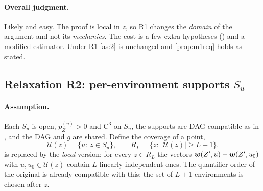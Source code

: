 \paragraph{Overall judgment.} Likely and easy. The proof is local in $z$, so R1 changes the 
\emph{domain} of the argument and not its \emph{mechanics}. The cost is a few extra hypotheses 
() and a modified
estimator. Under R1 \cref{as:2} is unchanged and \cref{prop:m1req} holds as stated.

\subsection{Relaxation R2: per-environment supports $S_u$}
\label{app:support:r2}

\paragraph{Assumption.} Each $S_u$ is open, $p^{(u)}_Z>0$ and $\mathrm{C}^3$ on $S_u$, the supports 
are DAG-compatible as in , and the DAG and $g$ are shared. Define 
the coverage of a point,
\[
\mathcal U(z)=\{u:\ z\in S_u\},\qquad R_{L}=\{z:\ |\mathcal U(z)|\ge L+1\}.
\]
 is replaced by the \emph{local} version: for every $z\in R_L$ the vectors
$\boldsymbol{w}(Z',u)-\boldsymbol{w}(Z',u_0)$ with $u,u_0\in\mathcal U(z)$ contain $L$ linearly independent ones. The
quantifier order of the original is already compatible with this: the set of $L+1$ environments is chosen
after $z$.

